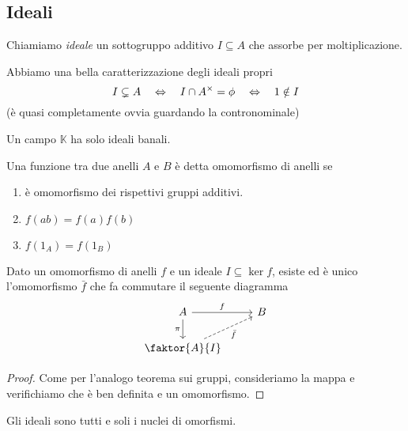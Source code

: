 \begin{multicols}{2}
\subsection{Ideali}
\begin{definition}[ideale]
	Chiamiamo \emph{ideale} un sottogruppo additivo $ I \subseteq A $ che assorbe per moltiplicazione.
\end{definition}

\begin{remark}
	Abbiamo una bella caratterizzazione degli ideali propri
	\[ I \subsetneq A \quad\Leftrightarrow\quad I \cap A^\times = \phi \quad\Leftrightarrow\quad 1 \notin I \]
	(è quasi completamente ovvia guardando la contronominale)
\end{remark}


\begin{remark}
	Un campo $ \mathbb{K} $ ha solo ideali banali.
\end{remark}

\begin{definition}[Omomorfismo]
	Una funzione tra due anelli $ A $ e $ B $ è detta omomorfismo di anelli se
	\begin{enumerate}
		\item è omomorfismo dei rispettivi gruppi additivi.
		\item $ f(ab)=f(a)f(b) $
		\item $ f(1_A)=f(1_B) $
	\end{enumerate}
\end{definition}

\begin{theorem}[di omomorfismo]\label{omoanelli}
	Dato un omomorfismo di anelli $ f $ e un ideale $ I \subseteq \ker f $, esiste ed è unico l'omomorfismo $ \bar{f} $ che fa commutare il seguente diagramma
	\[ \begin{tikzcd}
	A \arrow{r}{f} \arrow[swap]{d}{\pi} & B \\
	\faktor{A}{I} \arrow[swap, dashed]{ru}{\bar{f}}
	\end{tikzcd} \]
\end{theorem}
\begin{proof}
	Come per l'analogo teorema sui gruppi, consideriamo la mappa
	e verifichiamo che è ben definita e un omomorfismo.
\end{proof}
\begin{remark}
	Gli ideali sono tutti e soli i nuclei di omorfismi.
\end{remark}


\end{multicols}
